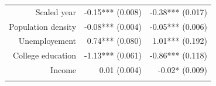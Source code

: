 \documentclass[]{article}
\begin{document}
\begin{longtable}[c]{@{}rrr@{}}
\begin{minipage}[t]{0.24\columnwidth}
Scaled year
\strut\end{minipage} &
\begin{minipage}[t]{0.24\columnwidth}\raggedleft\strut
-0.15*** (0.008)
\strut\end{minipage} &
\begin{minipage}[t]{0.24\columnwidth}\raggedleft\strut
-0.38*** (0.017)
\strut\end{minipage}\tabularnewline
\begin{minipage}[t]{0.24\columnwidth}\raggedleft\strut
Population density
\strut\end{minipage} &
\begin{minipage}[t]{0.24\columnwidth}\raggedleft\strut
-0.08*** (0.004)
\strut\end{minipage} &
\begin{minipage}[t]{0.24\columnwidth}\raggedleft\strut
-0.05*** (0.006)
\strut\end{minipage}\tabularnewline
\begin{minipage}[t]{0.24\columnwidth}\raggedleft\strut
Unemployement
\strut\end{minipage} &
\begin{minipage}[t]{0.24\columnwidth}\raggedleft\strut
0.74*** (0.080)
\strut\end{minipage} &
\begin{minipage}[t]{0.24\columnwidth}\raggedleft\strut
1.01*** (0.192)
\strut\end{minipage}\tabularnewline
\begin{minipage}[t]{0.24\columnwidth}\raggedleft\strut
College education
\strut\end{minipage} &
\begin{minipage}[t]{0.24\columnwidth}\raggedleft\strut
-1.13*** (0.061)
\strut\end{minipage} &
\begin{minipage}[t]{0.24\columnwidth}\raggedleft\strut
-0.86*** (0.118)
\strut\end{minipage}\tabularnewline
\begin{minipage}[t]{0.24\columnwidth}\raggedleft\strut
Income
\strut\end{minipage} &
\begin{minipage}[t]{0.24\columnwidth}\raggedleft\strut
0.01 (0.004)
\strut\end{minipage} &
\begin{minipage}[t]{0.24\columnwidth}\raggedleft\strut
-0.02* (0.009)
\strut\end{minipage}\tabularnewline
\begin{minipage}[t]{0.24\columnwidth}\raggedleft\strut

\end{minipage}
\end{longtable}
\end{document}
